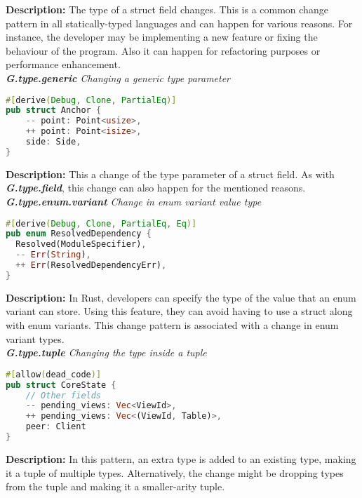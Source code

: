 \noindent\textbf{Description:} The type of a struct field changes. This is a common change pattern in all statically-typed languages and can happen for various reasons. For instance, the developer may be implementing a new feature or fixing the behaviour of the program. Also it can happen for refactoring purposes or performance enhancement. \\

\noindent\textit{\textbf{G.type.generic} Changing a generic type parameter}

\begin{lstlisting}[language=Rust, style=colouredRust]
#[derive(Debug, Clone, PartialEq)]
pub struct Anchor {
    -- point: Point<usize>,
    ++ point: Point<isize>,
    side: Side,
}

\end{lstlisting}

\noindent\textbf{Description:} This a change of the type parameter of a struct field. As with \textit{\textbf{G.type.field}}, this change can also happen for the mentioned reasons. \\

\noindent\textit{\textbf{G.type.enum.variant} Change in enum variant value type}

\begin{lstlisting}[language=Rust, style=colouredRust]
#[derive(Debug, Clone, PartialEq, Eq)]
pub enum ResolvedDependency {
  Resolved(ModuleSpecifier),
  -- Err(String),
  ++ Err(ResolvedDependencyErr),
}

\end{lstlisting}

\noindent\textbf{Description:} In Rust, developers can specify the type of the value that an enum variant can store. Using this feature, they can avoid having to use a struct along with enum variants. This change pattern is associated with a change in enum variant types. \\


\noindent\textit{\textbf{G.type.tuple} Changing the type inside a tuple}

\begin{lstlisting}[language=Rust, style=colouredRust]
#[allow(dead_code)]
pub struct CoreState {
    // Other fields
    -- pending_views: Vec<ViewId>,
    ++ pending_views: Vec<(ViewId, Table)>,
    peer: Client
}
\end{lstlisting}



\noindent\textbf{Description:} In this pattern, an extra type is added to an existing type, making it a tuple of multiple types. Alternatively, the change might be dropping types from the tuple and making it a smaller-arity tuple.

